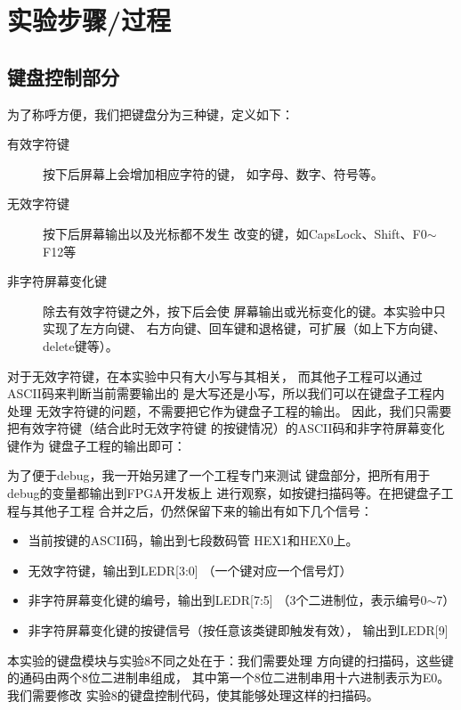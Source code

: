 \documentclass[12pt,a4paper,UTF8]{article}
\begin{document}
\section{实验步骤/过程}
\subsection{键盘控制部分}
为了称呼方便，我们把键盘分为三种键，定义如下：
\begin{description}
  \item[有效字符键] 按下后屏幕上会增加相应字符的键，
        如字母、数字、符号等。
  \item[无效字符键] 按下后屏幕输出以及光标都不发生
        改变的键，如CapsLock、Shift、\mbox{F0$\sim$F12}等
  \item[非字符屏幕变化键] 除去有效字符键之外，按下后会使
        屏幕输出或光标变化的键。本实验中只实现了左方向键、
        右方向键、回车键和退格键，可扩展（如上下方向键、
        delete键等）。
\end{description}

对于无效字符键，在本实验中只有大小写与其相关，
而其他子工程可以通过ASCII码来判断当前需要输出的
是大写还是小写，所以我们可以在键盘子工程内处理
无效字符键的问题，不需要把它作为键盘子工程的输出。
因此，我们只需要把有效字符键（结合此时无效字符键
的按键情况）的ASCII码和非字符屏幕变化键作为
键盘子工程的输出即可：

为了便于debug，我一开始另建了一个工程专门来测试
键盘部分，把所有用于debug的变量都输出到FPGA开发板上
进行观察，如按键扫描码等。在把键盘子工程与其他子工程
合并之后，仍然保留下来的输出有如下几个信号：
\begin{itemize}
  \item 当前按键的ASCII码，输出到七段数码管
        \mbox{HEX1}和\mbox{HEX0}上。
  \item 无效字符键，输出到\mbox{LEDR[3:0]}
        （一个键对应一个信号灯）
  \item 非字符屏幕变化键的编号，输出到\mbox{LEDR[7:5]}
        （3个二进制位，表示编号0$\sim$7）
  \item 非字符屏幕变化键的按键信号（按任意该类键即触发有效），
        输出到\mbox{LEDR[9]}
\end{itemize}

本实验的键盘模块与实验8不同之处在于：我们需要处理
方向键的扫描码，这些键的通码由两个8位二进制串组成，
其中第一个8位二进制串用十六进制表示为E0。我们需要修改
实验8的键盘控制代码，使其能够处理这样的扫描码。
\end{document}
